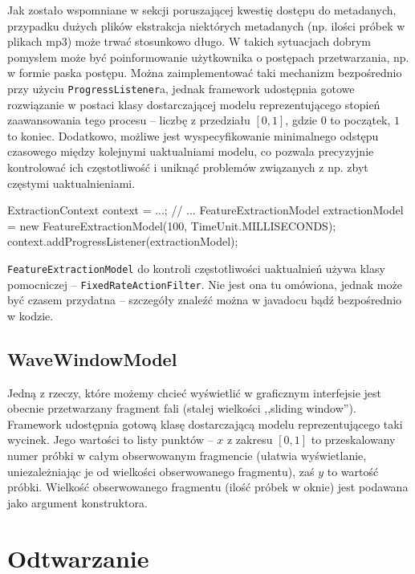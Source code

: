 Jak zostało wspomniane w sekcji poruszającej kwestię dostępu do metadanych, przypadku dużych plików
ekstrakcja niektórych metadanych (np. ilości próbek w plikach mp3) może trwać stosunkowo długo. W
takich sytuacjach dobrym pomysłem może być poinformowanie użytkownika o postępach przetwarzania, np.
w formie paska postępu. Można zaimplementować taki mechanizm bezpośrednio przy użyciu
\texttt{ProgressListener}a, jednak framework udostępnia gotowe rozwiązanie w postaci klasy
dostarczającej modelu reprezentującego stopień zaawansowania tego procesu -- liczbę z przedziału
$[0, 1]$, gdzie $0$ to początek, $1$ to koniec. Dodatkowo, możliwe jest wyspecyfikowanie minimalnego
odstępu czasowego między kolejnymi uaktualniami modelu, co pozwala precyzyjnie kontrolować ich
częstotliwość i uniknąć problemów związanych z np. zbyt częstymi uaktualnieniami.

\begin{java}
ExtractionContext context = ...;
// ...
FeatureExtractionModel extractionModel =
        new FeatureExtractionModel(100, TimeUnit.MILLISECONDS);
context.addProgressListener(extractionModel);
\end{java}

\begin{Tip}
\texttt{FeatureExtractionModel} do kontroli częstotliwości uaktualnień używa klasy pomocniczej --
\texttt{FixedRateActionFilter}. Nie jest ona tu omówiona, jednak może być czasem przydatna --
szczegóły znaleźć można w javadocu bądź bezpośrednio w kodzie.
\end{Tip}

\subsection{WaveWindowModel}

Jedną z rzeczy, które możemy chcieć wyświetlić w graficznym interfejsie jest obecnie przetwarzany
fragment fali (stałej wielkości ,,sliding window''). Framework udostępnia gotową klasę dostarczającą
modelu reprezentującego taki wycinek. Jego wartości to listy punktów -- $x$ z zakresu $[0, 1]$ to
przeskalowany numer próbki w całym obserwowanym fragmencie (ułatwia wyświetlanie, uniezależniając je
od wielkości obserwowanego fragmentu), zaś $y$ to wartość próbki. Wielkość obserwowanego fragmentu
(ilość próbek w oknie) jest podawana jako argument konstruktora.

\section{Odtwarzanie}

